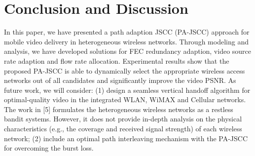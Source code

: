 \documentclass[journal]{IEEEtran}
\begin{document}
\section{Conclusion and Discussion}
In this paper, we have presented a path adaption JSCC (PA-JSCC) approach for mobile video delivery in heterogeneous wireless networks. Through modeling and analysis, we have developed solutions for FEC redundancy adaption, video source rate adaption and flow rate allocation. Experimental results show that the proposed PA-JSCC is able to dynamically select the appropriate wireless access networks out of all candidates and significantly improve the video PSNR. As future work, we will consider: (1) design a seamless vertical handoff algorithm for optimal-quality video in the integrated WLAN, WiMAX and Cellular networks. The work in [5] formulates the heterogeneous wireless networks as a restless bandit systems. However, it does not provide in-depth analysis on the physical characteristics (e.g., the coverage and received signal strength) of each wireless network; (2) include an optimal path interleaving mechanism with the PA-JSCC for overcoming the burst loss.
\end{document}
